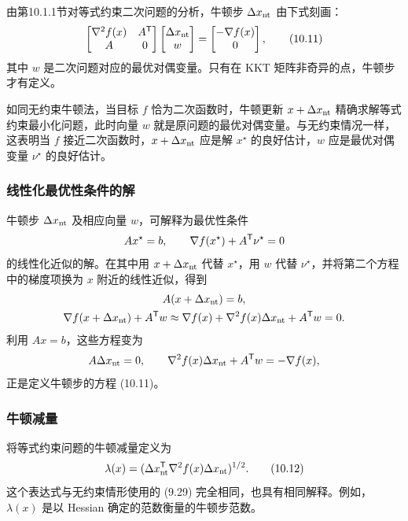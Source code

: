 由第10.1.1节对等式约束二次问题的分析，牛顿步 $\Delta x_{\rm nt}$ 由下式刻画：
\begin{equation}\begin{bmatrix}\nabla^2f(x)&A^\mathsf T\\A&0\end{bmatrix}\begin{bmatrix}\Delta x_{\rm nt}\\w\end{bmatrix}=\begin{bmatrix}-\nabla f(x)\\0\end{bmatrix},\tag{10.11}\end{equation}
其中 $w$ 是二次问题对应的最优对偶变量。只有在 KKT 矩阵非奇异的点，牛顿步才有定义。

如同无约束牛顿法，当目标 $f$ 恰为二次函数时，牛顿更新 $x+\Delta x_{\rm nt}$ 精确求解等式约束最小化问题，此时向量 $w$ 就是原问题的最优对偶变量。与无约束情况一样，这表明当 $f$ 接近二次函数时，$x+\Delta x_{\rm nt}$ 应是解 $x^\star$ 的良好估计，$w$ 应是最优对偶变量 $\nu^\star$ 的良好估计。

\subsubsection*{线性化最优性条件的解}
牛顿步 $\Delta x_{\rm nt}$ 及相应向量 $w$，可解释为最优性条件
\[Ax^\star=b,\qquad\nabla f(x^\star)+A^\mathsf T\nu^\star=0\]
的线性化近似的解。在其中用 $x+\Delta x_{\rm nt}$ 代替 $x^\star$，用 $w$ 代替 $\nu^\star$，并将第二个方程中的梯度项换为 $x$ 附近的线性近似，得到
\[\begin{gathered}
A(x+\Delta x_{\rm nt})=b,\\
\nabla f(x+\Delta x_{\rm nt})+A^\mathsf T w\approx\nabla f(x)+\nabla^2 f(x)\Delta x_{\rm nt}+A^\mathsf T w=0.
\end{gathered}\]
利用 $Ax=b$，这些方程变为
\[A\Delta x_{\rm nt}=0,\qquad\nabla^2f(x)\Delta x_{\rm nt}+A^\mathsf T w=-\nabla f(x),\]
正是定义牛顿步的方程 (10.11)。

\subsubsection*{牛顿减量}
将等式约束问题的牛顿减量定义为
\begin{equation}\lambda(x)=(\Delta x_{\rm nt}^\mathsf T\nabla^2f(x)\Delta x_{\rm nt})^{1/2}.\tag{10.12}\end{equation}
这个表达式与无约束情形使用的 (9.29) 完全相同，也具有相同解释。例如，$\lambda(x)$ 是以 Hessian 确定的范数衡量的牛顿步范数。

